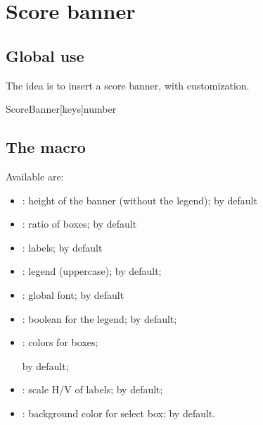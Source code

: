 \documentclass[english,11pt,a4paper]{article}
\begin{document}
\pagebreak

\section{Score banner}

\subsection{Global use}

The idea is to insert a score banner, with customization.

\begin{codehigh}[language=latex/latex3,style/main=teal!25,style/code=teal!25]
ScoreBanner[keys]{number}
\end{codehigh}

\begin{demohigh}[language=latex/latex3,style/main=teal!25,style/code=teal!25]
\ScoreBanner{}
\end{demohigh}

\subsection{The macro}

Available  are:

\begin{itemize}
	\item {}: height of the banner (without the legend);  by default
	\item {}: ratio of boxes;  by default
	\item {}: labels;  by default
	\item {}: legend (uppercase);  by default;
	\item {}: global font;  by default
	\item {}: boolean for the legend;   by default;
	\item {}: colors for boxes;

	\hfill{} by default;
	\item {}: scale H/V of labels;   by default;
	\item {}: background color for select box;   by default.
\end{itemize}
\end{document}
